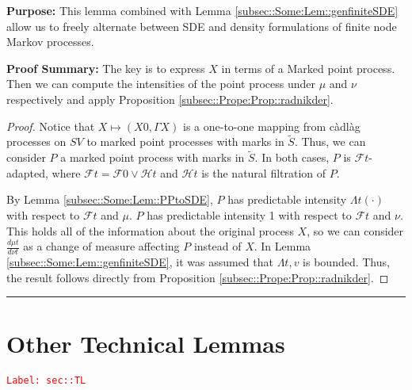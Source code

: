 \documentclass[12pt]{article}
\newcommand{\mc}{\mathcal}
\newcommand{\tr}{\textcolor{red}}
\newcommand{\labe}[1]{\tr{\texttt{Label: #1}}}
\newcommand{\purpose}{\textbf{Purpose: }}
\newcommand{\pfsum}{\textbf{Proof Summary: }}
\newcommand{\ind}{\hspace{24pt}}
\newcommand{\lin}{\rule{\linewidth}{0.4 pt}}
\renewcommand{\v}{v}							%
\renewcommand{\S}{S}							%
\renewcommand{\t}{t}							%
\newcommand{\F}{\mc{F}}							%
\newcommand{\FH}{\mc{H}}						%
\newcommand{\X}{X}								%
\newcommand{\alt}[1]{\widetilde{#1}}			%
\newcommand{\m}{\mu}							%
\newcommand{\mm}{\nu}							%
\newcommand{\pmap}{\Gamma}						%
\newcommand{\rp}{P}								%
\newcommand{\ratee}{\Lambda}					%
\begin{document}
\purpose This lemma combined with Lemma \ref{subsec::Some:Lem::genfiniteSDE} allow us to freely alternate between SDE and density formulations of finite node Markov processes.

\pfsum The key is to express \(X\) in terms of a Marked point process. Then we can compute the intensities of the point process under \(\m\) and \(\mm\) respectively and apply Proposition \ref{subsec::Prope:Prop::radnikder}.

\begin{proof}
Notice that \(\X{}{} \mapsto (\X{}{0},\pmap{\X{}{}})\) is a one-to-one mapping from c\`adl\`ag processes on \(\S{V}\) to marked point processes with marks in \(\alt{\S}\). Thus, we can consider \(\rp{}\) a marked point process with marks in \(\alt{\S}\). In both cases, \(\rp{}\) is \(\F{}{\t}\)-adapted, where \(\F{}{\t} = \F{}{0}\vee \FH{}{\t}\) and \(\FH{}{\t}\) is the natural filtration of \(\rp{}\).

\ind By Lemma \ref{subsec::Some:Lem::PPtoSDE}, \(\rp{}\) has predictable intensity \(\ratee{\t}(\cdot)\) with respect to \(\F{}{\t}\) and \(\m{}{}{}\). \(\rp{}\) has predictable intensity 1 with respect to \(\F{}{\t}\) and \(\mm{}{}{}\). This holds all of the information about the original process \(\X{}{}\), so we can consider \(\frac{d\m{}{\t}{}}{d\mm{}{\t}{}}\) as a change of measure affecting \(\rp{}\) instead of \(\X{}{}\). In Lemma \ref{subsec::Some:Lem::genfiniteSDE}, it was assumed that \(\ratee{\t,\v}\) is bounded. Thus, the result follows directly from Proposition \ref{subsec::Prope:Prop::radnikder}. 
\end{proof}

\lin
\section{Other Technical Lemmas}
\label{sec::TL}\labe{sec::TL}
\end{document}
